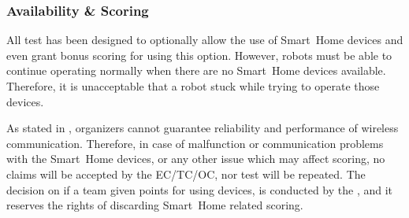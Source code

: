\subsubsection{Availability \& Scoring}
All test has been designed to optionally allow the use of Smart~Home devices and even grant bonus scoring for using this option. However, robots must be able to continue operating normally when there are no Smart~Home devices available. Therefore, it is unacceptable that a robot stuck while trying to operate those devices.

As stated in , organizers cannot guarantee reliability and performance of wireless communication. Therefore, in case of malfunction or communication problems with the Smart~Home devices, or any other issue which may affect scoring, no claims will be accepted by the EC/TC/OC, nor test will be repeated. The decision on if a team given points for using  devices, is conducted by the , and it reserves the rights of discarding Smart~Home related scoring.


